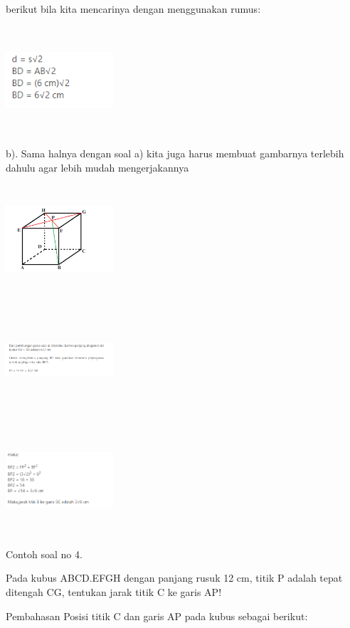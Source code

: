 \documentclass[11pt,fleqn]{book} %
\begin{document}
berikut bila kita mencarinya dengan menggunakan rumus:

\includegraphics[width = 4cm, height= 4cm]{Pictures/gi18.png}

b). Sama halnya dengan soal a) kita juga harus membuat gambarnya terlebih dahulu agar lebih mudah mengerjakannya

\includegraphics[width = 4cm, height= 4cm]{Pictures/gi19.png}

\includegraphics[width = 4cm, height= 4cm]{Pictures/gi20.png}

\includegraphics[width = 4cm, height= 4cm]{Pictures/20.png}

Contoh soal no 4.

Pada kubus ABCD.EFGH dengan panjang rusuk 12 cm, titik P adalah tepat ditengah CG, tentukan jarak titik C ke garis AP!

Pembahasan
Posisi titik C dan garis AP pada kubus sebagai berikut: 
\end{document}
